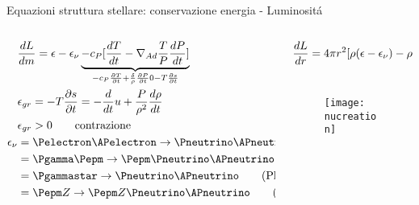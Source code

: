 \begin{frame}{Equazioni struttura stellare: conservazione energia - Luminosit\'a}
\begin{columns}[T]
\begin{column}{0.4\textwidth}
\begin{align*}
&\TDy{m}{L}=\epsilon-\epsilon_{\nu} \underbrace{-c_P[\TDy{t}{T}-\nad\frac{T}{P}\TDy{t}{P}]}_{-c_P\PDy{t}{T}+\frac{\delta}{\rho}\PDy{t}{P}0-T\PDy{t}{s}}\\
&\epsilon_{gr}=-T\PDy{t}{s}=-\TDof{t}u+\frac{P}{\rho^2}\TDy{t}{\rho}\\
&\epsilon_{gr}>0\tag*{contrazione}\\
\epsilon_{\nu}&=\Pelectron\APelectron\to\Pneutrino\APneutrino\tag{Pair annihilation}\\
&=\Pgamma\Pepm\to\Pepm\Pneutrino\APneutrino\tag{Photoproduction}\\
&=\Pgammastar\to\Pneutrino\APneutrino\tag{Plasmon decay}\\
&=\Pepm Z\to\Pepm Z\Pneutrino\APneutrino\tag{Bremsstahlung}\\
    \end{align*}

\end{column}\begin{column}{0.6\textwidth}
\begin{align*}
&\TDy{r}{L}=4\pi r^2[\rho(\epsilon-\epsilon_{\nu})-\rho\TDof{t}u+\frac{P}{\rho}\TDy{t}{\rho}]\\
&
\end{align*}
\begin{figure}[!ht]
            \centering
            \texttt{[image: nucreation]}
            \label{fig:nucreation}
        \end{figure}
\end{column}
\end{columns}
\end{frame}

